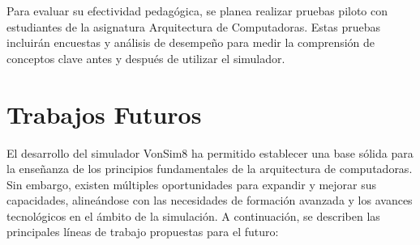 \documentclass[12pt,oneside]{templates/unerthesis}
\begin{document}
Para evaluar su efectividad pedagógica, se planea realizar pruebas piloto con estudiantes de la asignatura Arquitectura de Computadoras. Estas pruebas incluirán encuestas y análisis de desempeño para medir la comprensión de conceptos clave antes y después de utilizar el simulador.

\hypertarget{futuro}{%
\chapter{Trabajos Futuros}\label{futuro}}

El desarrollo del simulador VonSim8 ha permitido establecer una base sólida para la enseñanza de los principios fundamentales de la arquitectura de computadoras. Sin embargo, existen múltiples oportunidades para expandir y mejorar sus capacidades, alineándose con las necesidades de formación avanzada y los avances tecnológicos en el ámbito de la simulación. A continuación, se describen las principales líneas de trabajo propuestas para el futuro:
\end{document}
